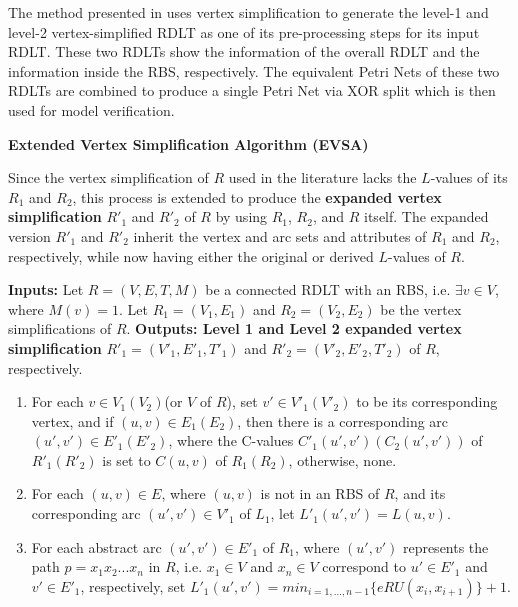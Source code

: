         The method presented in  \cite{sulla-malinao} uses vertex simplification to generate the level-1 and level-2 vertex-simplified RDLT as one of its pre-processing steps for its input RDLT. These two RDLTs show the information of the overall RDLT and the information inside the RBS, respectively. The equivalent Petri Nets of these two RDLTs are combined to produce a single Petri Net via XOR split which is then used for model verification.

        \begin{definition} \textbf{Extended Vertex Simplification Algorithm (EVSA)} \cite{malinao-wctp}

            Since the vertex simplification of $R$ used in the literature lacks the $L$-values of its $R_{1}$ and $R_{2}$, this process is extended to produce the \textbf{expanded vertex simplification} $R'_{1}$ and $R'_{2}$ of $R$ by using $R_{1}$, $R_{2}$, and $R$ itself. The expanded version $R'_{1}$ and $R'_{2}$ inherit the vertex and arc sets and attributes of $R_{1}$ and $R_{2}$, respectively, while now having either the original or derived $L$-values of $R$.

            \textbf{Inputs:} Let $R=(V,E,T,M)$ be a connected RDLT with an RBS, i.e. $\exists v \in V$, where $M(v)=1$. Let $R_{1}=(V_{1},E_{1})$ and $R_{2}=(V_{2},E_{2})$ be the vertex simplifications of $R$.
            \textbf{Outputs: Level 1 and Level 2 expanded vertex simplification} $R'_{1}=(V'_{1},E'_{1},T'_{1})$ and $R'_{2}=(V'_{2},E'_{2},T'_{2})$ of $R$, respectively.

            \begin{enumerate}
                \item For each $v \in V_{1}(V_{2})$(or $V$ of $R$), set $v' \in V'_{1}(V'_{2})$ to be its corresponding vertex, and if $(u,v) \in E_{1}(E_{2})$, then there is a corresponding arc $(u',v') \in E'_{1}(E'_{2})$, where the C-values $C'_{1}(u',v')(C_{2}(u',v'))$ of $R'_{1}(R'_2)$ is set to $C(u,v)$ of $R_{1}(R_{2})$, otherwise, none.

                \item For each $(u,v) \in E$, where $(u,v)$ is not in an RBS of $R$, and its corresponding arc $(u',v') \in V'_{1}$ of $L_{1}$, let $L'_{1}(u',v')=L(u,v)$.

                \item For each abstract arc $(u',v') \in E'_{1}$ of $R_{1}$, where $(u',v')$ represents the path $p=x_{1}x_{2}...x_{n}$ in $R$, i.e. $x_{1} \in V$ and $x_{n} \in V$ correspond to $u' \in E'_{1}$ and $v' \in E'_{1}$, respectively, set $L'_{1}(u',v')=min_{i=1,...,n-1} \{eRU(x_{i},x_{i+1})\}+1$.
                
            \end{enumerate}
        
        \end{definition}

